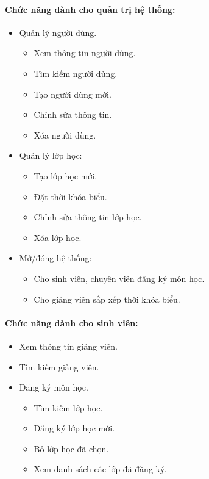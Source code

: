 \documentclass[12pt]{book}
\begin{document}
    \paragraph{Chức năng dành cho quản trị hệ thống:}
    \begin{itemize}
      \item Quản lý người dùng.
      \begin{itemize}
        \item Xem thông tin người dùng.
        \item Tìm kiếm người dùng.
        \item Tạo người dùng mới.
        \item Chỉnh sửa thông tin.
        \item Xóa người dùng.
      \end{itemize}
      \item Quản lý lớp học:
      \begin{itemize}
        \item Tạo lớp học mới.
        \item Đặt thời khóa biểu.
        \item Chỉnh sửa thông tin lớp học.
        \item Xóa lớp học.
      \end{itemize}
      \item Mở/đóng hệ thống:
      \begin{itemize}
        \item Cho sinh viên, chuyên viên đăng ký môn học.
        \item Cho giảng viên sắp xếp thời khóa biểu.
      \end{itemize}
    \end{itemize}

    \paragraph{Chức năng dành cho sinh viên:}
    \begin{itemize}
      \item Xem thông tin giảng viên.
      \item Tìm kiếm giảng viên.
      \item Đăng ký môn học.
      \begin{itemize}
        \item Tìm kiếm lớp học.
        \item Đăng ký lớp học mới.
        \item Bỏ lớp học đã chọn.
        \item Xem danh sách các lớp đã đăng ký.
      \end{itemize}
    \end{itemize}
\end{document}
